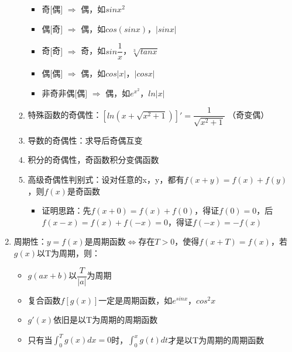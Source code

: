 \documentclass{ctexart}
\begin{document}
\begin{theorem}[函数的四种特性]
\begin{enumerate}
\begin{enumerate}
\begin{itemize}
                        \item 奇$[$偶$]$ $\Rightarrow$ 偶，如$sinx^2$
                        \item 偶$[$奇$]$ $\Rightarrow$ 偶，如$cos(sinx)$，$|sinx|$
                        \item 奇$[$奇$]$ $\Rightarrow$ 奇，如$sin\dfrac{1}{x}$，$\sqrt[3]{tanx}$
                        \item 偶$[$偶$]$ $\Rightarrow$ 偶，如$cos|x|$，$|cosx|$
                        \item 非奇非偶$[$偶$]$ $\Rightarrow$ 偶，如$e^{x^2}$，$ln|x|$
                    \end{itemize}
                \item 特殊函数的奇偶性：$[ln(x+\sqrt{x^2+1})]'=\dfrac{1}{\sqrt{x^2+1}}$ （奇变偶）
                \item 导数的奇偶性：求导后奇偶互变
                \item 积分的奇偶性，奇函数积分变偶函数
                \item 高级奇偶性判别式：设对任意的x，y，都有$f(x+y)=f(x)+f(y)$，则$f(x)$是奇函数
                    \begin{itemize}
                        \item 证明思路：先$f(x+0)=f(x)+f(0)$，得证$f(0)=0$，后$f(x-x)=f(x)+f(-x)=0$，得证$f(-x)=-f(x)$
                    \end{itemize}
            \end{enumerate}
        \item 周期性：$y=f(x)$是周期函数$\Leftrightarrow$存在$T>0$，使得$f(x+T)=f(x)$，若$g(x)$以T为周期，则：
            \begin{itemize}
                \item $g(ax+b)$以$\dfrac{T}{|a|}$为周期
                \item 复合函数$f[g(x)]$一定是周期函数，如$e^{sinx}$，$cos^2x$
                \item $g'(x)$依旧是以T为周期的周期函数
                \item 只有当$\int_{0}^{T}g(x)dx=0$时，$\int_{0}^{x}g(t)dt$才是以T为周期的周期函数
            \end{itemize}
    \end{enumerate}
\end{theorem}
\end{document}
